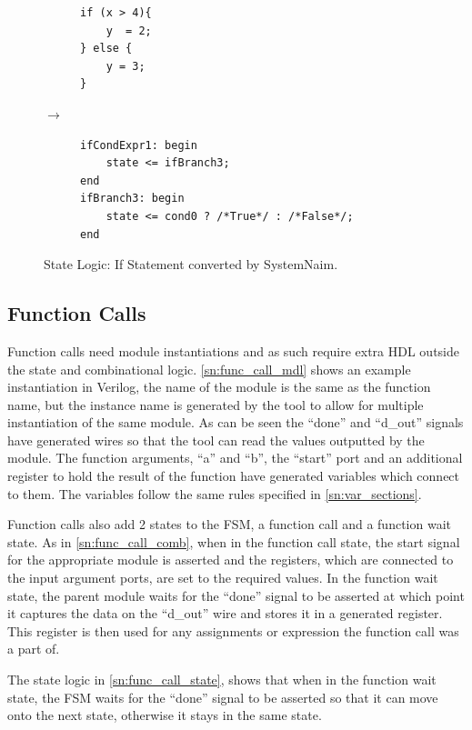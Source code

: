 \begin{figure}[H]
\centering
\begin{subfigure}{0.22\textwidth}
    \centering
    \begin{verbatim}
if (x > 4){
    y  = 2;
} else {
    y = 3;
}
\end{verbatim}
\end{subfigure}%
{\LARGE$\rightarrow$}%
\begin{subfigure}{0.6\textwidth}
    \begin{verbatim}
ifCondExpr1: begin
    state <= ifBranch3;
end
ifBranch3: begin
    state <= cond0 ? /*True*/ : /*False*/;
end
    \end{verbatim}
\end{subfigure}
\caption{State Logic: If Statement converted by SystemNaim.}
\label{sn:if_state}
\end{figure}

\subsection{Function Calls}
\label{sn:func_sec}

Function calls need module instantiations and as such require extra HDL outside the state and combinational logic. \autoref{sn:func_call_mdl} shows an example instantiation in Verilog, the name of the module is the same as the function name, but the instance name is generated by the tool to allow for multiple instantiation of the same module. As can be seen the “done” and “d\_out” signals have generated wires so that the tool can read the values outputted by the module. The function arguments, “a” and “b”, the “start” port and an additional register to hold the result of the function have generated variables which connect to them. The variables follow the same rules specified in \autoref{sn:var_sections}.

Function calls also add 2 states to the FSM, a function call and a function wait state. As in \autoref{sn:func_call_comb}, when in the function call state, the start signal for the appropriate module is asserted and the registers, which are connected to the input argument ports, are set to the required values. In the function wait state, the parent module waits for the “done” signal to be asserted at which point it captures the data on the “d\_out” wire and stores it in a generated register. This register is then used for any assignments or expression the function call was a part of.

The state logic in \autoref{sn:func_call_state}, shows that when in the function wait state, the FSM waits for the “done” signal to be asserted so that it can move onto the next state, otherwise it stays in the same state.

